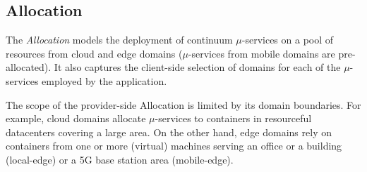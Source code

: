 


\subsection{Allocation}\label{sec:A3-E-allocation}



The \textit{Allocation} models the deployment of continuum $\mu$-services on a pool of resources from cloud and edge domains ($\mu$-services from mobile domains are pre-allocated). It also captures the client-side selection of domains for each of the $\mu$-services employed by the application.


The scope of the provider-side Allocation is limited by its domain boundaries. For example, cloud domains allocate $\mu$-services to containers in resourceful datacenters covering a large area. On the other hand, edge domains rely on containers from one or more (virtual) machines serving an office or a building (local-edge) or a 5G base station area (mobile-edge). %

